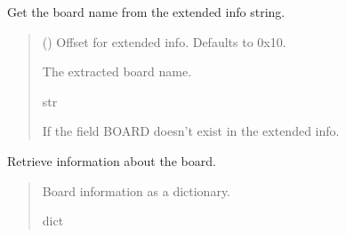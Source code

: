 \documentclass[letterpaper,10pt,english]{sphinxmanual}
\begin{document}
\begin{fulllineitems}
\begin{fulllineitems}
\begin{quote}
\begin{description}
\end{description}\end{quote}

\end{fulllineitems}



\begin{fulllineitems}

\pysigstartsignatures
{}
\pysigstopsignatures
\sphinxAtStartPar
Get the board name from the extended info string.
\begin{quote}\begin{description}
\sphinxAtStartPar
{} (\sphinxstyleliteralemphasis{\sphinxupquote{, }}) \textendash{} Offset for extended info. Defaults to 0x10.

\sphinxAtStartPar
The extracted board name.

\sphinxAtStartPar
str

\sphinxAtStartPar
{} \textendash{} If the field BOARD doesn’t exist in the extended info.

\end{description}\end{quote}

\end{fulllineitems}



\begin{fulllineitems}

\pysigstartsignatures
{}
\pysigstopsignatures
\sphinxAtStartPar
Retrieve information about the board.
\begin{quote}\begin{description}
\sphinxAtStartPar
Board information as a dictionary.

\sphinxAtStartPar
dict

\end{description}\end{quote}

\end{fulllineitems}




\end{fulllineitems}
\end{document}
